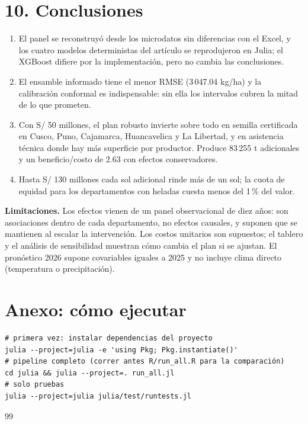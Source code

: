 \documentclass[letterpaper]{report}
\begin{document}
\begin{article}
\section{10. Conclusiones}
\begin{enumerate}
\item El panel se reconstruyó desde los microdatos sin diferencias con el Excel, y los cuatro modelos deterministas del artículo se reprodujeron en Julia; el XGBoost difiere por la implementación, pero no cambia las conclusiones.
\item El ensamble informado tiene el menor RMSE (3\,047.04 kg/ha) y la calibración conformal es indispensable: sin ella los intervalos cubren la mitad de lo que prometen.
\item Con S/ 50 millones, el plan robusto invierte sobre todo en semilla certificada en Cusco, Puno, Cajamarca, Huancavelica y La Libertad, y en asistencia técnica donde hay más superficie por productor. Produce 83\,255 t adicionales y un beneficio/costo de 2.63 con efectos conservadores.
\item Hasta S/ 130 millones cada sol adicional rinde más de un sol; la cuota de equidad para los departamentos con heladas cuesta menos del 1\,\% del valor.
\end{enumerate}

\textbf{Limitaciones.} Los efectos vienen de un panel observacional de diez años: son asociaciones dentro de cada departamento, no efectos causales, y suponen que se mantienen al escalar la intervención. Los costos unitarios son supuestos; el tablero y el análisis de sensibilidad muestran cómo cambia el plan si se ajustan. El pronóstico 2026 supone covariables iguales a 2025 y no incluye clima directo (temperatura o precipitación).

\section{Anexo: cómo ejecutar}
\begin{Verbatim}[fontsize=\scriptsize, frame=single, framesep=2mm, label={\small Comandos}]
# primera vez: instalar dependencias del proyecto
julia --project=julia -e 'using Pkg; Pkg.instantiate()'
# pipeline completo (correr antes R/run_all.R para la comparación)
cd julia && julia --project=. run_all.jl
# solo pruebas
julia --project=julia julia/test/runtests.jl
\end{Verbatim}

\begin{thebibliography}{99}


\end{thebibliography}
\end{article}
\end{document}
